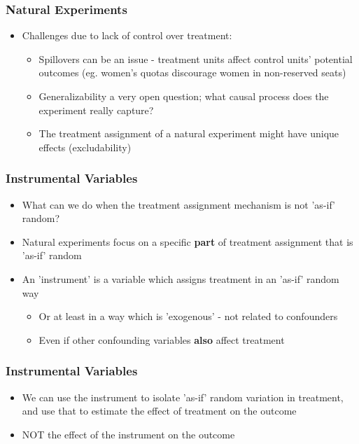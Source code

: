 \documentclass[xcolor=x11names,compress]{beamer}\usepackage[]{graphicx}\usepackage[]{color}
\renewcommand{\(}{\begin{columns}}
\renewcommand{\)}{\end{columns}}
\newcommand{\<}[1]{\begin{column}{#1}}
\renewcommand{\>}{\end{column}}
\begin{document}
\begin{frame}
\frametitle{Natural Experiments}
\begin{itemize}
\item Challenges due to lack of control over treatment: 
\begin{itemize}
\item Spillovers can be an issue - treatment units affect control units' potential outcomes (eg. women's quotas discourage women in non-reserved seats)
\item Generalizability a very open question; what causal process does the experiment really capture?
\item The treatment assignment of a natural experiment might have unique effects (excludability)
\end{itemize}
\end{itemize}
\end{frame}



\begin{frame}
\frametitle{Instrumental Variables}
\begin{itemize}
\item What can we do when the treatment assignment mechanism is not 'as-if' random?
\pause
\item Natural experiments focus on a specific \textbf{part} of treatment assignment that is 'as-if' random
\pause
\item An 'instrument' is a variable which assigns treatment in an 'as-if' random way
\pause
\begin{itemize}
\item Or at least in a way which is 'exogenous' - not related to confounders
\item Even if other confounding variables \textbf{also} affect treatment
\end{itemize}
\end{itemize}
\end{frame}

\begin{frame}
\frametitle{Instrumental Variables}
\begin{itemize}
\item We can use the instrument to isolate 'as-if' random variation in treatment, and use that to estimate the effect of treatment on the outcome
\pause
\item NOT the effect of the instrument on the outcome
\end{itemize}
\end{frame}
\end{document}
